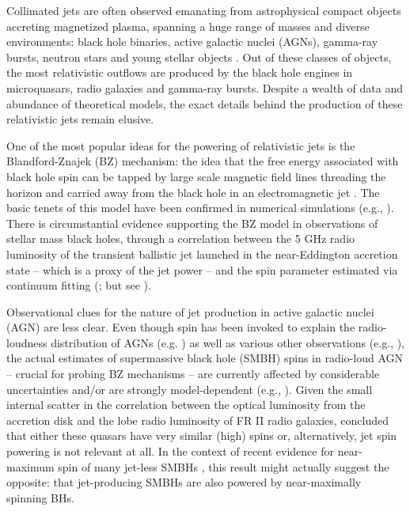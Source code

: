 \documentclass[useAMS,usenatbib]{mn2e}
\begin{document}
Collimated jets are often observed emanating from astrophysical compact objects accreting magnetized plasma, spanning a huge range of masses and diverse environments: black hole binaries, active galactic nuclei (AGNs), gamma-ray bursts, neutron stars and young stellar objects \citep{Belloni10}. Out of these classes of objects, the most relativistic outflows are produced by the black hole engines in microquasars, radio galaxies and gamma-ray bursts. Despite a wealth of data and abundance of theoretical models, the exact details behind the production of these relativistic jets remain elusive. 

One of the most popular ideas for the powering of relativistic jets is the Blandford-Znajek (BZ) mechanism: the idea that the free energy associated with black hole spin can be tapped by large scale magnetic field lines threading the horizon and carried away from the black hole in an electromagnetic jet \citep{Blandford77,Meier12}. The basic tenets of this model have been confirmed in numerical simulations (e.g., \citealt{Semenov04,2005MNRAS.359..801K,Sasha12rev}). 
There is circumstantial evidence supporting the BZ model in observations of stellar mass black holes, through a correlation between the 5 GHz radio luminosity of the transient ballistic jet launched in the near-Eddington accretion state \citep{Fender12} -- which is a proxy of the jet power -- and the spin parameter estimated via continuum fitting (\citealt{Narayan12,Steiner13}; but see \citealt{Fender10,Russell13bhb}). 

Observational clues for the nature of jet production in active galactic nuclei (AGN) are less clear. Even though spin has been invoked to explain the radio-loudness distribution of AGNs (e.g. \citealt{Sikora07,Sasha10}) as well as various other observations (e.g., \citealt{Gardner14}), the actual estimates of supermassive black hole (SMBH) spins in radio-loud AGN -- crucial for probing BZ mechanisms -- are currently affected by considerable uncertainties and/or are strongly model-dependent (e.g., \citealt{Nemmen07,Martinez-Sansigre11,King13spin,Daly14}). Given the small internal scatter in the correlation between the optical luminosity from the accretion disk and the lobe radio luminosity of FR II radio galaxies, \cite{van-Velzen13} concluded that either these quasars have very similar (high) spins or, alternatively, jet spin powering is not relevant at all. In the context of recent evidence for near-maximum spin of many jet-less SMBHs \citep{Reynolds13}, this result might actually suggest the opposite: that jet-producing SMBHs are also powered by near-maximally spinning BHs.
\end{document}
